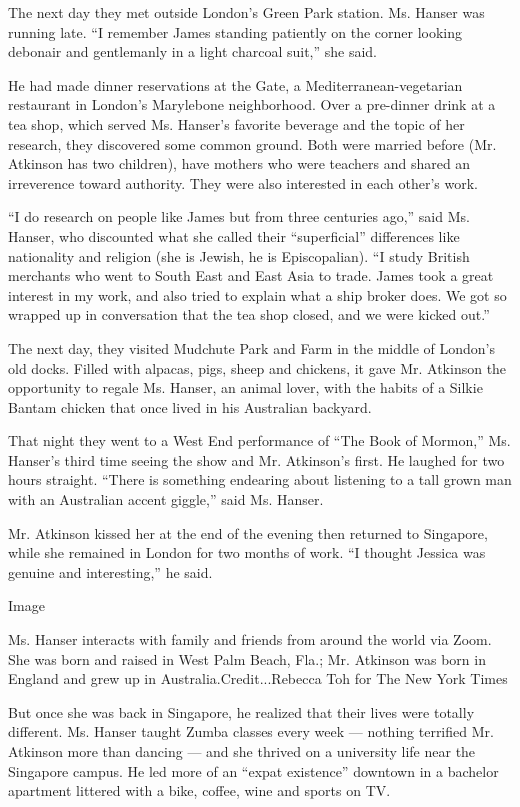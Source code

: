 The next day they met outside London's Green Park station. Ms. Hanser
was running late. ``I remember James standing patiently on the corner
looking debonair and gentlemanly in a light charcoal suit,'' she said.

He had made dinner reservations at the Gate, a Mediterranean-vegetarian
restaurant in London's Marylebone neighborhood. Over a pre-dinner drink
at a tea shop, which served Ms. Hanser's favorite beverage and the topic
of her research, they discovered some common ground. Both were married
before (Mr. Atkinson has two children), have mothers who were teachers
and shared an irreverence toward authority. They were also interested in
each other's work.

``I do research on people like James but from three centuries ago,''
said Ms. Hanser, who discounted what she called their ``superficial''
differences like nationality and religion (she is Jewish, he is
Episcopalian). ``I study British merchants who went to South East and
East Asia to trade. James took a great interest in my work, and also
tried to explain what a ship broker does. We got so wrapped up in
conversation that the tea shop closed, and we were kicked out.''

The next day, they visited Mudchute Park and Farm in the middle of
London's old docks. Filled with alpacas, pigs, sheep and chickens, it
gave Mr. Atkinson the opportunity to regale Ms. Hanser, an animal lover,
with the habits of a Silkie Bantam chicken that once lived in his
Australian backyard.

That night they went to a West End performance of ``The Book of
Mormon,'' Ms. Hanser's third time seeing the show and Mr. Atkinson's
first. He laughed for two hours straight. ``There is something endearing
about listening to a tall grown man with an Australian accent giggle,''
said Ms. Hanser.

Mr. Atkinson kissed her at the end of the evening then returned to
Singapore, while she remained in London for two months of work. ``I
thought Jessica was genuine and interesting,'' he said.

Image

Ms. Hanser interacts with family and friends from around the world via
Zoom. She was born and raised in West Palm Beach, Fla.; Mr. Atkinson was
born in England and grew up in Australia.Credit...Rebecca Toh for The
New York Times

But once she was back in Singapore, he realized that their lives were
totally different. Ms. Hanser taught Zumba classes every week ---
nothing terrified Mr. Atkinson more than dancing --- and she thrived on
a university life near the Singapore campus. He led more of an ``expat
existence'' downtown in a bachelor apartment littered with a bike,
coffee, wine and sports on TV.

